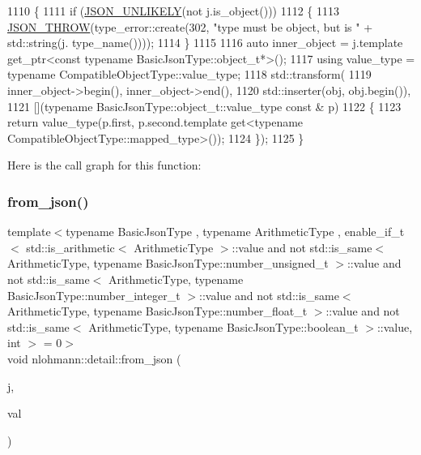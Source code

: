 \begin{DoxyCode}
1110 \{
1111     \textcolor{keywordflow}{if} (\hyperlink{json_8hpp_ab77582407c64944e7db1ea95ab520253}{JSON\_UNLIKELY}(not j.is\_object()))
1112     \{
1113         \hyperlink{json_8hpp_a6c274f6db2e65c1b66c7d41b06ad690f}{JSON\_THROW}(type\_error::create(302, \textcolor{stringliteral}{"type must be object, but is "} + std::string(j.
      type\_name())));
1114     \}
1115 
1116     \textcolor{keyword}{auto} inner\_object = j.template get\_ptr<const typename BasicJsonType::object\_t*>();
1117     \textcolor{keyword}{using} value\_type = \textcolor{keyword}{typename} CompatibleObjectType::value\_type;
1118     std::transform(
1119         inner\_object->begin(), inner\_object->end(),
1120         std::inserter(obj, obj.begin()),
1121         [](\textcolor{keyword}{typename} BasicJsonType::object\_t::value\_type \textcolor{keyword}{const} & p)
1122     \{
1123         \textcolor{keywordflow}{return} value\_type(p.first, p.second.template get<typename CompatibleObjectType::mapped\_type>());
1124     \});
1125 \}
\end{DoxyCode}
Here is the call graph for this function\+:
\mbox{\label{namespacenlohmann_1_1detail_a839b0ab50d2c9bce669068f56bc41202}} 
\subsubsection{\texorpdfstring{from\+\_\+json()}{from\_json()}\hspace{0.1cm}{\footnotesize\ttfamily [12/14]}}
{\footnotesize\ttfamily template$<$typename Basic\+Json\+Type , typename Arithmetic\+Type , enable\+\_\+if\+\_\+t$<$ std\+::is\+\_\+arithmetic$<$ Arithmetic\+Type $>$\+::value and not std\+::is\+\_\+same$<$ Arithmetic\+Type, typename Basic\+Json\+Type\+::number\+\_\+unsigned\+\_\+t $>$\+::value and not std\+::is\+\_\+same$<$ Arithmetic\+Type, typename Basic\+Json\+Type\+::number\+\_\+integer\+\_\+t $>$\+::value and not std\+::is\+\_\+same$<$ Arithmetic\+Type, typename Basic\+Json\+Type\+::number\+\_\+float\+\_\+t $>$\+::value and not std\+::is\+\_\+same$<$ Arithmetic\+Type, typename Basic\+Json\+Type\+::boolean\+\_\+t $>$\+::value, int $>$  = 0$>$ \\
void nlohmann\+::detail\+::from\+\_\+json (\begin{DoxyParamCaption}\item[{const Basic\+Json\+Type \&}]{j,  }\item[{Arithmetic\+Type \&}]{val }\end{DoxyParamCaption})}



